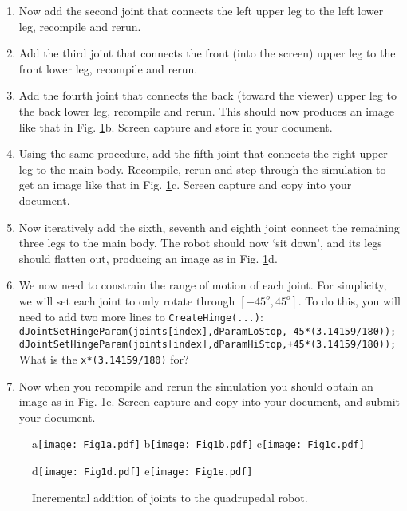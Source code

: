 \documentclass[12pt]{article}
\begin{document}
\begin{enumerate}
\item Now add the second joint that connects the left upper leg to the left lower leg, recompile and rerun.

\item Add the third joint that connects the front (into the screen) upper leg to the front lower leg, recompile and rerun.

\item Add the fourth joint that connects the back (toward the viewer) upper leg to the back lower leg, recompile and rerun. This should now produces an image like that in Fig. \ref{Fig1}b. Screen capture and store in your document.

\item Using the same procedure, add the fifth joint that connects the right upper leg to the main body. Recompile, rerun and step through the simulation to get an image like that in Fig. \ref{Fig1}c. Screen capture and copy into your document.

\item Now iteratively add the sixth, seventh and eighth joint connect the remaining three legs to the main body. The robot should now `sit down', and its legs should flatten out, producing an image as in Fig. \ref{Fig1}d.

\item We now need to constrain the range of motion of each joint. For simplicity, we will set each joint to only rotate through $[-45^o,45^o]$. To do this, you will need to add two more lines to \texttt{CreateHinge(...)}: \\
    \texttt{dJointSetHingeParam(joints[index],dParamLoStop,-45*(3.14159/180));} \\
    \texttt{dJointSetHingeParam(joints[index],dParamHiStop,+45*(3.14159/180));} \\
    What is the \texttt{x*(3.14159/180)} for?

\item Now when you recompile and rerun the simulation you should obtain an image as in Fig. \ref{Fig1}e. Screen capture and copy into your document, and submit your document.

\end{enumerate}

\begin{figure}[!t]
\centerline{
a\texttt{[image: Fig1a.pdf]}
b\texttt{[image: Fig1b.pdf]}
c\texttt{[image: Fig1c.pdf]}}
\centerline{
d\texttt{[image: Fig1d.pdf]}
e\texttt{[image: Fig1e.pdf]}}
\caption{Incremental addition of joints to the quadrupedal robot.}
\label{Fig1}
\end{figure}
\end{document}
